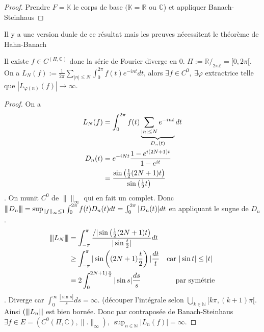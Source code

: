 \begin{proof}
    Prendre $F=\mathbb{K}$ le corps de base $(\mathbb{K}=\mathbb{R} $ ou $\mathbb{C}$) et appliquer Banach-Steinhaus
\end{proof}
\begin{remarque}
    Il y a une version duale de ce résultat mais les preuves nécessitent le théorème de Hahn-Banach
\end{remarque}
\begin{ex}
    Il existe $f\in C^ (\Pi,\mathbb{C})$ donc la série de Fourier diverge en 0. $\Pi:=\mathbb{R} /_{2\pi\mathbb{Z} }=[0,2\pi[$. On a $L_N(f):=\frac{1}{2\pi}\sum\limits_{|n|\le N}^{} \int_0^{2\pi}f(t)e^{-int}dt$, alors $\exists f\in C^0,\ \exists \varphi $ extractrice telle que $|L_{\varphi (n)}(f)|\to \infty $.
\end{ex}
\begin{proof}
    On a
     \begin{align*}
         L_N(f)&=\int_0^{2\pi}f(t)\underbrace{\sum\limits_{|n|\le N}^{} e^{-i nt}}_{\mathclap{D_n(t)}}dt\\
         D_n(t)&=e^{-i Nt}\frac{1-e^{i(2N+1)t}}{1-e^{it}}\\
               &=\frac{\sin \left( \frac{1}{2}(2N+1)t \right) }{\sin\left( \frac{1}{2}t \right) }
     \end{align*}.
     On munit $C^0$ de $\|\|_\infty $ qui en fait un complet. Donc ${\left\vert\kern-0.25ex\left\vert\kern-0.25ex\left\vert D_n \right\vert\kern-0.25ex\right\vert\kern-0.25ex\right\vert}=\sup_{\|f\|_\infty \le 1}\int_0^{2\pi}f(t)D_n(t)dt=\int_0^{2\pi}|D_n(t)|dt$ en appliquant le sugne de $D_n$.\\
      \begin{align*}
          {\left\vert\kern-0.25ex\left\vert\kern-0.25ex\left\vert L_N \right\vert\kern-0.25ex\right\vert\kern-0.25ex\right\vert}&=\int_{-\pi}^\pi\frac{/|\sin\left( \frac{1}{2}(2N+1)t \right) }{|\sin \frac{t}{2}|}dt\\
                       &\ge \int_{-\pi}^\pi |\sin\left((2N+1)\frac{t}{2}\right)|\frac{dt}{t} &\text{car $|\sin t|\le |t|$ }\\
                       &= 2\int_0^{2N+1)\frac{\pi}{2}}|\sin s|\frac{ds}{s} &\text{par symétrie}
     \end{align*}.
     Diverge car $\int _0^\infty \frac{|\sin s|}{s}ds=\infty .$ (découper l'intégrale selon $\bigcup\limits_{k\in \mathbb{N} } [k\pi,(k+1)\pi[.$ \\
     Ainsi $({\left\vert\kern-0.25ex\left\vert\kern-0.25ex\left\vert L_n \right\vert\kern-0.25ex\right\vert\kern-0.25ex\right\vert}$ est bien bornée. Donc par contraposée de Banach-Steinhaus $\exists f\in E=(C^0(\Pi,\mathbb{C}),\|.\|_\infty ),\ \sup_{n\in \mathbb{N} }|L_n(f)|=\infty .$
\end{proof}

